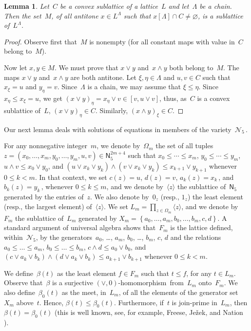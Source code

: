 \documentclass[reqno]{amsart}
\numberwithin{equation}{section}
\theoremstyle{plain}
\newtheorem{lemma}[theorem]{Lemma}
\theoremstyle{definition}
\theoremstyle{remark}
\numberwithin{figure}{section}
\numberwithin{table}{section}
\begin{document}
\begin{lemma}\label{L:ConvRngLat}
Let~$C$ be a convex sublattice of a lattice~$L$ and let~${\Lambda}$ be a chain.
Then the set~$M$, of all antitone $x\in L^{\Lambda}$ such that $x[{\Lambda}]\cap C\neq{\varnothing}$, is a sublattice of~$L^{\Lambda}$.
\end{lemma}

\begin{proof}
Observe first that~$M$ is nonempty (for all constant maps with value in~$C$ belong to~$M$).

Now let $x,y\in M$.
We must prove that $x\vee y$ and~$x\wedge y$ both belong to~$M$.
The maps $x\vee y$ and~$x\wedge y$ are both antitone.
Let $\xi,\eta\in{\Lambda}$ and $u,v\in C$ such that $x_{\xi}=u$ and $y_{\eta}=v$.
Since~${\Lambda}$ is a chain, we may assume that $\xi\leq\eta$.
Since $x_{\eta}\leq x_{\xi}=u$, we get $(x\vee y)_{\eta}=x_{\eta}\vee v\in[v,u\vee v]$, thus, as~$C$ is a convex sublattice of~$L$, $(x\vee y)_{\eta}\in C$.
Similarly, $(x\wedge y)_{\xi}\in C$.
\end{proof}

Our next lemma deals with solutions of equations in members of the variety~${\mathcal{N}}_5$\,.

For any nonnegative integer~$m$, we denote by~${\Omega}_m$ the set of all
tuples $z=(x_0,\dots,x_m,y_0,\dots,y_m,u,v)\in{{\mathsf{N}}}_5^{2m+4}$ such that $x_0\leq\cdots\leq x_m$, $y_0\leq\cdots\leq y_m$, $u\wedge v\leq x_0\vee y_0$, and $(u\vee x_k\vee y_k)\wedge(v\vee x_k\vee y_k)\leq x_{k+1}\vee y_{k+1}$ whenever $0\leq k<m$.
In that context, we set $c(z)=u$, $d(z)=v$, $a_k(z)=x_k$\,, and $b_k(z)=y_k$\,, whenever $0\leq k\leq m$, and we denote by~${\langle{{z}}\rangle}$ the sublattice of~${{\mathsf{N}}}_5$ generated by the entries of~$z$.
We also denote by~$0_z$ (resp., $1_z$) the least element (resp., the largest element) of~${\langle{{z}}\rangle}$.
We set $L_m=\prod_{z\in{\Omega}_m}{\langle{{z}}\rangle}$, and we denote by~$F_m$ the sublattice of~$L_m$ generated by $X_m={\left\{{a_0,\dots,a_m,b_0,\dots,b_m,c,d}\right\}}$.
A standard argument of universal algebra shows that~$F_m$ is the lattice defined, within~${\mathcal{N}}_5$, by the generators~$a_0$, \dots, $a_m$, $b_0$, \dots, $b_m$, $c$, $d$ and the relations $a_0\leq\dots\leq a_m$, $b_0\leq\dots\leq b_m$, $c\wedge d\leq a_0\vee b_0$, and $(c\vee a_k\vee b_k)\wedge(d\vee a_k\vee b_k)\leq a_{k+1}\vee b_{k+1}$ whenever $0\leq k<m$.

We define~$\beta(t)$ as the least element $f\in F_m$ such that $t\leq f$, for any $t\in L_m$.
Observe that~$\beta$ is a surjective {{$(\vee,0)$}-ho\-mo\-mor\-phism}\ from~$L_m$ onto~$F_m$.
We also define~$\beta_0(t)$ as the meet, in~$L_m$, of all the elements of the generator set~$X_m$ above~$t$.
Hence, $\beta(t)\leq\beta_0(t)$.
Furthermore, if~$t$ is join-prime in~$L_m$, then $\beta(t)=\beta_0(t)$ (this is well known, see, for example, Freese, Je\v{z}ek, and Nation \cite[Theorem~2.4]{FJN}).
\end{document}
